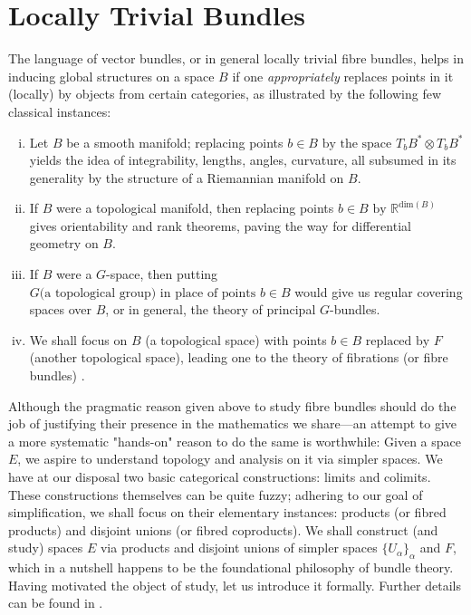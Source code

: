 \documentclass[11pt,a4paper]{article}
\begin{document}
\section{Locally Trivial Bundles}


The language of vector bundles, or in general locally trivial fibre bundles, helps in inducing global structures on a space $B$ if one \textit{appropriately} replaces points in it (locally) by objects from certain categories, as illustrated by the following few classical instances:


\begin{enumerate}[(i)]
    \item Let $B$ be a smooth manifold; replacing points $b \in B \text{ by the space } T_bB^* \otimes T_bB^*$
    yields the idea of integrability, lengths, angles, curvature, all subsumed in its generality by the structure of a Riemannian manifold on $B$.

    \item If $B$ were a topological manifold, then replacing points $b \in B \text{ by } \mathbb{R}^{\text{dim}(B)}$ gives orientability and rank theorems, paving the way for differential geometry on $B$.

    \item If $B$ were a $G$-space, then putting $G  \text{(a topological group) in place of points }b\in B$ would give us regular covering spaces over $B$, or in general, the theory of principal $G$-bundles.

    \item We shall focus on $B$ (a topological space) with points $b \in B \text{ replaced by } F$ (another topological space), leading one to the theory of fibrations (or fibre bundles) \cite{fomenko2016homotopical}.
\end{enumerate}

Although the pragmatic reason given above to study fibre bundles should do the job of justifying their presence in the mathematics we share---an attempt to give a more systematic "hands-on" reason to do the same is worthwhile: Given a space $E$, we aspire to understand topology and analysis on it via simpler spaces. We have at our disposal two basic categorical constructions: limits and colimits. These constructions themselves can be quite fuzzy; adhering to our goal of simplification, we shall focus on their elementary instances: products (or fibred products) and disjoint unions (or fibred coproducts). We shall construct (and study) spaces $E$ via products and disjoint unions of simpler spaces $\{U_{\alpha}\}_{\alpha}$ and $F$, which in a nutshell happens to be the foundational philosophy of bundle theory. Having motivated the object of study, let us introduce it formally. Further details can be found in \cite{luke2013vector}.
\end{document}
